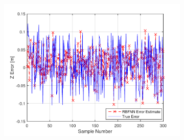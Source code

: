 \begin{figure}
\begin{subfigure}{0.3\textwidth}
    \includegraphics[width=\textwidth]{figures/chapter4/z_train}
    \caption{}
  \end{subfigure}


\end{figure}
